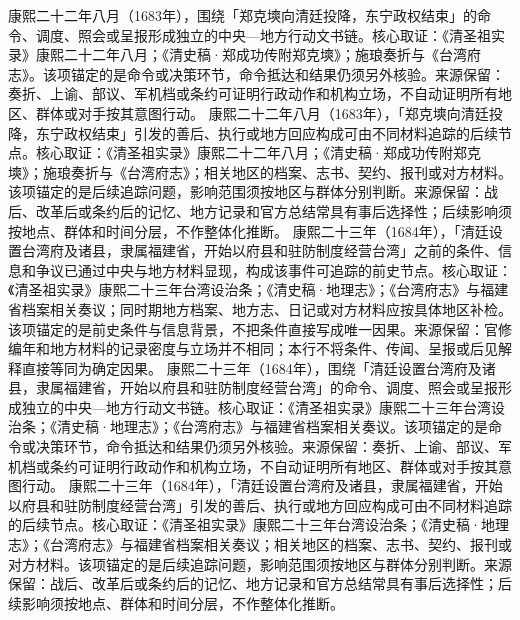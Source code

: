 康熙二十二年八月（1683年），围绕「郑克塽向清廷投降，东宁政权结束」的命令、调度、照会或呈报形成独立的中央—地方行动文书链。核心取证：《清圣祖实录》康熙二十二年八月；《清史稿·郑成功传附郑克塽》；施琅奏折与《台湾府志》。该项锚定的是命令或决策环节，命令抵达和结果仍须另外核验。来源保留：奏折、上谕、部议、军机档或条约可证明行政动作和机构立场，不自动证明所有地区、群体或对手按其意图行动。
康熙二十二年八月（1683年），「郑克塽向清廷投降，东宁政权结束」引发的善后、执行或地方回应构成可由不同材料追踪的后续节点。核心取证：《清圣祖实录》康熙二十二年八月；《清史稿·郑成功传附郑克塽》；施琅奏折与《台湾府志》；相关地区的档案、志书、契约、报刊或对方材料。该项锚定的是后续追踪问题，影响范围须按地区与群体分别判断。来源保留：战后、改革后或条约后的记忆、地方记录和官方总结常具有事后选择性；后续影响须按地点、群体和时间分层，不作整体化推断。
康熙二十三年（1684年），「清廷设置台湾府及诸县，隶属福建省，开始以府县和驻防制度经营台湾」之前的条件、信息和争议已通过中央与地方材料显现，构成该事件可追踪的前史节点。核心取证：《清圣祖实录》康熙二十三年台湾设治条；《清史稿·地理志》；《台湾府志》与福建省档案相关奏议；同时期地方档案、地方志、日记或对方材料应按具体地区补检。该项锚定的是前史条件与信息背景，不把条件直接写成唯一因果。来源保留：官修编年和地方材料的记录密度与立场并不相同；本行不将条件、传闻、呈报或后见解释直接等同为确定因果。
康熙二十三年（1684年），围绕「清廷设置台湾府及诸县，隶属福建省，开始以府县和驻防制度经营台湾」的命令、调度、照会或呈报形成独立的中央—地方行动文书链。核心取证：《清圣祖实录》康熙二十三年台湾设治条；《清史稿·地理志》；《台湾府志》与福建省档案相关奏议。该项锚定的是命令或决策环节，命令抵达和结果仍须另外核验。来源保留：奏折、上谕、部议、军机档或条约可证明行政动作和机构立场，不自动证明所有地区、群体或对手按其意图行动。
康熙二十三年（1684年），「清廷设置台湾府及诸县，隶属福建省，开始以府县和驻防制度经营台湾」引发的善后、执行或地方回应构成可由不同材料追踪的后续节点。核心取证：《清圣祖实录》康熙二十三年台湾设治条；《清史稿·地理志》；《台湾府志》与福建省档案相关奏议；相关地区的档案、志书、契约、报刊或对方材料。该项锚定的是后续追踪问题，影响范围须按地区与群体分别判断。来源保留：战后、改革后或条约后的记忆、地方记录和官方总结常具有事后选择性；后续影响须按地点、群体和时间分层，不作整体化推断。
